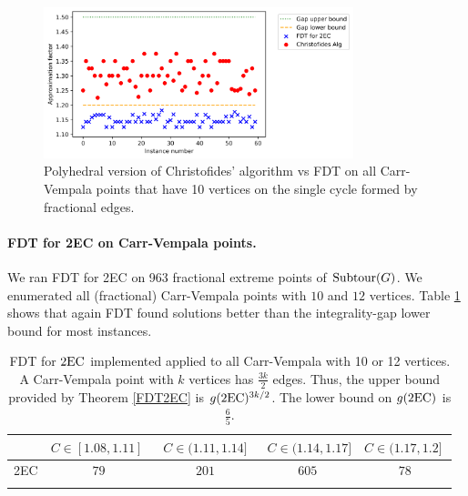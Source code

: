 \begin{figure}[h!]
	\centering
	\includegraphics[width=9cm,scale=1.4]{christofides-vs-fdt.png}
	\caption{Polyhedral version of Christofides' algorithm vs FDT on all Carr-Vempala points that have 10 vertices on the single cycle formed by fractional edges.}
	\label{fdtvschris}
\end{figure}
\paragraph{FDT for 2EC on Carr-Vempala points.}
We ran FDT for 2EC on 963 fractional extreme points of $\operatorname{{Subtour}}(G)$. We enumerated all (fractional) Carr-Vempala points with $10$ and $12$ vertices. Table \ref{table2EC} shows that again FDT found solutions better than the integrality-gap lower bound for most instances. 
\begin{table}[h!]
	\begin{small}
		\centering
		\begin{tabular}{c c c c c}
			\hline
			& $C\in [1.08,1.11]\;$ & $\;C\in (1.11,1.14]\;$ &
			$\;C\in (1.14,1.17]$ &\; $C\in (1.17,1.2]\;$ \\ \hline
			2EC & $79$ & $201$ & $605$ & $78$ \\ \hline\\
		\end{tabular}	\caption{FDT for $\2ec$ implemented applied to all Carr-Vempala with 10 or 12 vertices. A Carr-Vempala point with $k$ vertices has $\frac{3k}{2}$ edges. Thus, the upper bound provided by Theorem \ref{FDT2EC} is $g(\2ec)^{3k/2}$. The lower bound on $g(\2ec)$ is $\frac{6}{5}$.}
		\label{table2EC}
	\end{small}
\end{table}


